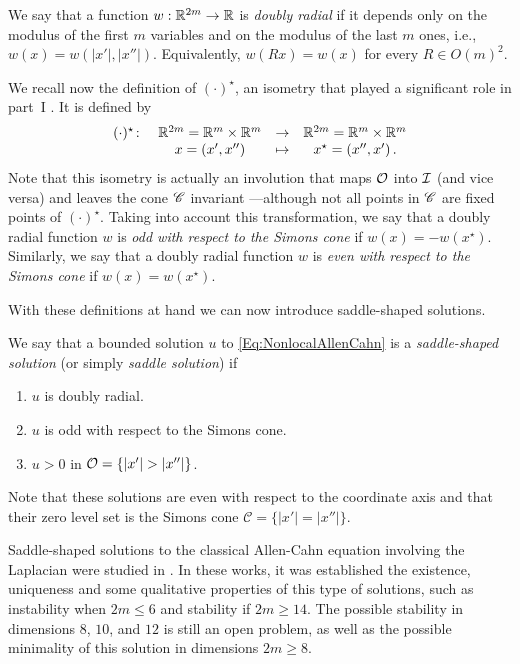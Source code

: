 We say that a function $w:\mathbb{R}^{2m}  \to \mathbb{R}$ is \emph{doubly radial} if it depends only on the modulus of the first $m$ variables and on the modulus of the last $m$ ones, i.e., $w(x) = w(|x'|,|x''|)$. Equivalently, $w(Rx) = w(x)$ for every $R \in O(m)^2$.

We recall now the definition of $(\cdot)^\star$, an isometry that played a significant role in part~I \cite{FelipeSanz-Perela:IntegroDifferentialI}. It is defined by
\begin{equation}
\label{Eq:DefStar}
\begin{matrix}
(\cdot)^\star \colon & \mathbb{R}^{2m}= \mathbb{R}^{m}\times \mathbb{R}^{m}  &\to&  \mathbb{R}^{2m}= \mathbb{R}^{m}\times \mathbb{R}^{m}  \\
& x = (x',x'') &\mapsto & x^\star = (x'',x')\,.
\end{matrix}
\end{equation}
Note that this isometry is actually an involution that maps $\mathcal{O}$ into $\mathcal{I}$ (and vice versa) and leaves the cone $\mathscr{C}$ invariant ---although not all points in $\mathscr{C}$ are fixed points of $(\cdot)^\star$. Taking into account this transformation, we say that a doubly radial function $w$ is \emph{odd with respect to the Simons cone} if $w(x) = -w(x^\star)$. Similarly, we say that a doubly radial function $w$ is \emph{even with respect to the Simons cone} if $w(x) = w(x^\star)$.



With these definitions at hand we can now introduce saddle-shaped solutions.
\begin{definition}
	\label{Def:SaddleShapedSol}
	We say that a bounded solution $u$ to \eqref{Eq:NonlocalAllenCahn} is a \emph{saddle-shaped solution} (or simply \emph{saddle solution}) if
	\begin{enumerate}
		\item $u$ is doubly radial.
		\item $u$ is odd with respect to the Simons cone.
		\item $u > 0$ in $\mathcal{O} = \{|x'| > |x''|\} $.
	\end{enumerate}
\end{definition}
Note that these solutions are even with respect to the coordinate axis and that their zero level set is the Simons cone $\mathscr{C} = \{|x'|=|x''|\}$. 


Saddle-shaped solutions to the classical Allen-Cahn equation involving the Laplacian were studied in \cite{DangFifePeletier, Schatzman, CabreTerraI,CabreTerraII, Cabre-Saddle}. In these works, it was established the existence, uniqueness and some qualitative properties of this type of solutions, such as instability when $2m\leq 6$ and stability if $2m\geq 14$. The possible stability in dimensions $8$, $10$, and $12$ is still an open problem, as well as the possible minimality of this solution in dimensions $2m \geq 8$.


